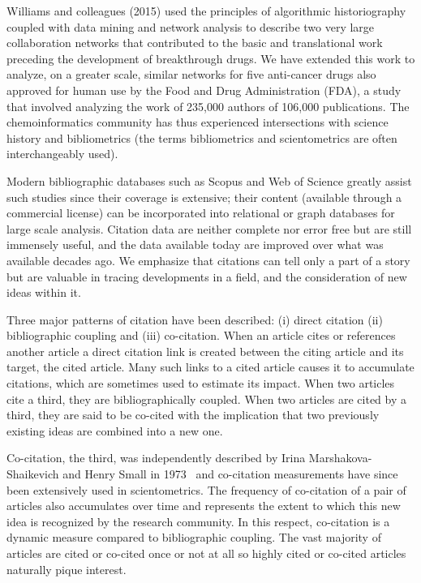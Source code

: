 \documentclass[journal=jcdis8,manuscript=article]{achemso}
\begin{document}
Williams and colleagues (2015)\citep{williams2015scientific} used the principles of algorithmic historiography coupled with data mining and network analysis to describe two very large collaboration networks that contributed to the basic and translational work preceding the development of breakthrough drugs. We have extended this work to analyze, on a greater scale, similar networks for five anti-cancer drugs also approved for human use by the Food and Drug Administration (FDA), a study that involved analyzing the work of 235,000 authors of 106,000 publications. The chemoinformatics community has thus experienced intersections with science history and bibliometrics (the terms bibliometrics and scientometrics are often interchangeably used). 


Modern bibliographic databases such as Scopus and Web of Science greatly assist such studies since their coverage is extensive; their content (available through a commercial license) can be incorporated into relational or graph databases for large scale analysis. Citation data are neither complete nor error free but are still immensely useful, and the data available today are improved over what was available decades ago. We emphasize that citations can tell only a part of a story but are valuable in tracing developments in a field, and the consideration of new ideas within it.  


Three major patterns of citation have been described: (i) direct citation (ii) bibliographic coupling and (iii) co-citation. When an article cites or references another article a direct citation link is created between the citing article and its target, the cited article. Many such links to a cited article causes it to accumulate citations, which are sometimes used to estimate its impact. When two articles cite a third, they are bibliographically coupled. When two articles are cited by a third, they are said to be co-cited with the implication that two previously existing ideas are combined into a new one. 

Co-citation, the third, was independently described by Irina Marshakova-Shaikevich and Henry Small in 1973~\citep{MarshakovaShaikevich1973,Small1973} and co-citation measurements have since been extensively used in scientometrics. The frequency of co-citation of a pair of articles  also accumulates over time and represents the extent to which this new idea is recognized by the research community. In this respect, co-citation is a dynamic measure compared to bibliographic coupling. The vast majority of articles are cited or co-cited once or not at all so highly cited or co-cited articles naturally pique interest. 
\end{document}
